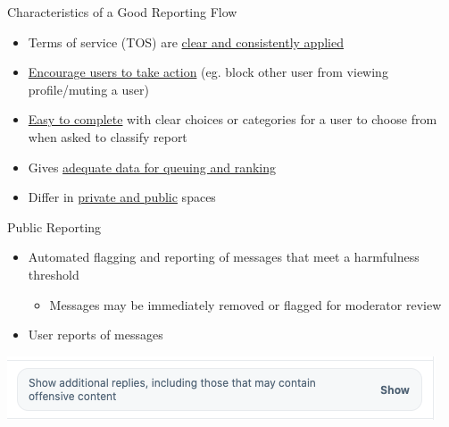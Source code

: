 \documentclass[nobackground,dvipsnames,table,aspectratio=169]{beamer}
\begin{document}
\begin{frame}{Characteristics of a Good Reporting Flow}
    \begin{itemize}
        \item Terms of service (TOS) are \underline{clear and consistently applied}
        \item \underline{Encourage users to take action} (eg. block other user from viewing profile/muting a user)
        \item \underline{Easy to complete} with clear choices or categories for a user to choose from when asked to classify report
        \item Gives \underline{adequate data for queuing and ranking}
        \item Differ in \underline{private and public} spaces
    \end{itemize}
\end{frame}

\begin{frame}{Public Reporting}
    \begin{itemize}
        \item Automated flagging and reporting of messages that meet a harmfulness threshold
        \begin{itemize}
            \item Messages may be immediately removed or flagged for moderator review
        \end{itemize}
        \item User reports of messages
    \end{itemize}
    \includegraphics[width=\textwidth]{show-offensive-content-twitter}
\end{frame}
\end{document}
